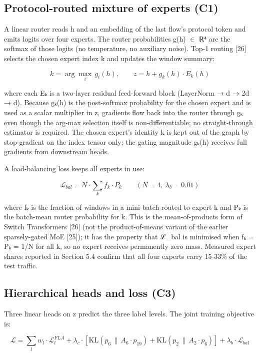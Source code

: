 \documentclass[11pt]{article}
\begin{document}
\subsection{Protocol-routed mixture of experts (C1)}
A linear router reads h and an embedding of the last flow's protocol token and emits logits over four experts. The router probabilities g(h) $\in$ ℝ⁴ are the softmax of those logits (no temperature, no auxiliary noise). Top-1 routing [26] selects the chosen expert index k and updates the window summary:

\begin{equation}
k = \arg\max_i\, g_i(h), \qquad z = h + g_k(h) \cdot E_k(h)
\label{eq:1}
\end{equation}

where each Eₖ is a two-layer residual feed-forward block (LayerNorm → d → 2d → d). Because gₖ(h) is the post-softmax probability for the chosen expert and is used as a scalar multiplier in z, gradients flow back into the router through gₖ even though the arg-max selection itself is non-differentiable; no straight-through estimator is required. The chosen expert's identity k is kept out of the graph by stop-gradient on the index tensor only; the gating magnitude gₖ(h) receives full gradients from downstream heads.

A load-balancing loss keeps all experts in use:

\begin{equation}
\mathcal{L}_{bal} = N \cdot \sum_k f_k \cdot P_k \qquad (N = 4,\ \lambda_b = 0.01)
\label{eq:2}
\end{equation}

where fₖ is the fraction of windows in a mini-batch routed to expert k and Pₖ is the batch-mean router probability for k. This is the mean-of-products form of Switch Transformers [26] (not the product-of-means variant of the earlier sparsely-gated MoE [25]); it has the property that ℒ\_bal is minimised when fₖ = Pₖ = 1/N for all k, so no expert receives permanently zero mass. Measured expert shares reported in Section 5.4 confirm that all four experts carry 15-33\% of the test traffic.

\subsection{Hierarchical heads and loss (C3)}
Three linear heads on z predict the three label levels. The joint training objective is:

\begin{equation}
\mathcal{L} = \sum_l w_l \cdot \mathcal{L}_l^{FLA} + \lambda_c \cdot \left[ \mathrm{KL}(p_6 \,\|\, A_6 \cdot p_{19}) + \mathrm{KL}(p_2 \,\|\, A_2 \cdot p_6) \right] + \lambda_b \cdot \mathcal{L}_{bal}
\label{eq:3}
\end{equation}
\end{document}
